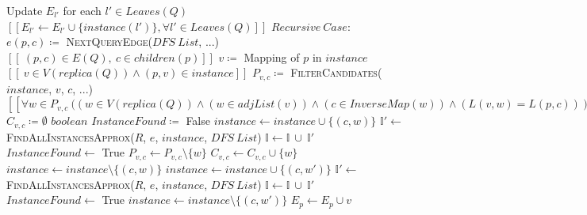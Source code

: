 \begin{algorithm}
{		Update $E_{l'}$ for each  $l'\in Leaves(Q)$\;
		\nonl $[[E_{l'}\leftarrow E_{l'} \cup \{instance(l')\}, \forall l' \in Leaves(Q)]]$ \;
		\;
	} 
		$Recursive\ Case:$\; 
		$e(p,c)\coloneq$ \textsc{NextQueryEdge($DFS\ List$, ...)}\; \nonl $[[\ (p,c) \in E(Q),\ c
		\in children(p)]]$\; $v\coloneq$ Mapping of $p$ in $instance$\; \nonl
		$[[\ v\in V(replica(Q))\wedge (p,v)\in instance]]$\;
	{${P_{v,c}}\coloneq$ \textsc{FilterCandidates($instance$, $v$, $c$, $...$)}
		\; \nonl $[[\forall w \in P_{v,c}\ ((w\in V(replica(Q))\wedge (w\in
		adjList(v)) \wedge (c\in InverseMap(w))\wedge (L(v,w)=L(p,c)) )]]$\;
		${C_{v,c}}\coloneq \emptyset$\;}
	$boolean$ $InstanceFound \coloneq$ {\sf False}\;  {$instance\leftarrow
		instance\cup \{(c,w)\}$\; $\mathbb{I'} \leftarrow $
		\textsc{FindAllInstancesApprox($R$, $e$, $instance$, $DFS\ List$)} \;
		{$\mathbb{I}\leftarrow \mathbb{I}\ \cup\ \mathbb{I'}$\;
			$InstanceFound\leftarrow$ {\sf True} \;}
		{	$P_{v,c}\leftarrow P_{v,c} \setminus \{w\}$\; $C_{v,c}\leftarrow
				C_{v,c} \cup \{w\}$\;} $instance\leftarrow instance \setminus
				\{(c,w)\}$\;}
	 {$instance\leftarrow
		instance\cup \{(c,w')\}$\; $\mathbb{I'} \leftarrow $
		\textsc{FindAllInstancesApprox($R$, $e$, $instance$, $DFS\ List$)} \;
		{$\mathbb{I}\leftarrow \mathbb{I}\ \cup\ \mathbb{I'}$\;
			$InstanceFound\leftarrow$ {\sf True} \;} $instance\leftarrow
			instance \setminus \{(c,w')\}$\;
	}
	{ $E_{p} \leftarrow E_{p} \cup v$} \;
\end{algorithm}
